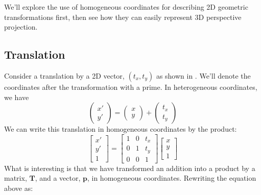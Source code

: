 
We'll explore the use of homogeneous coordinates for describing 2D geometric transformations first, then see how they can easily represent 3D perspective projection.


\subsection{Translation}

Consider a translation by a 2D vector, $(t_x, t_y)$ as shown in \fig{\ref{fig:translations}}. We'll denote the coordinates after the transformation with a prime. In heterogeneous coordinates, we have
\begin{equation}
    \begin{pmatrix}
    x' \\
    y' 
    \end{pmatrix}
    =
    \begin{pmatrix}
    x \\
    y 
    \end{pmatrix}
    +
    \begin{pmatrix}
    t_x \\
    t_y 
    \end{pmatrix}
\end{equation}
We can write this translation in homogeneous coordinates by the product:
\begin{equation}
    \begin{bmatrix}
    x' \\
    y' \\
    1
    \end{bmatrix}
    =
    \begin{bmatrix}
    1 & 0 & t_x \\
    0 & 1 & t_y \\
    0 & 0 & 1
    \end{bmatrix}
    \begin{bmatrix}
    x \\
    y \\
    1
    \end{bmatrix}
\end{equation}
What is interesting is that we have transformed an addition into a product by a matrix, $\mathbf{T}$, and a vector, $\mathbf{p}$, in homogeneous coordinates. 
Rewriting the equation above as:
